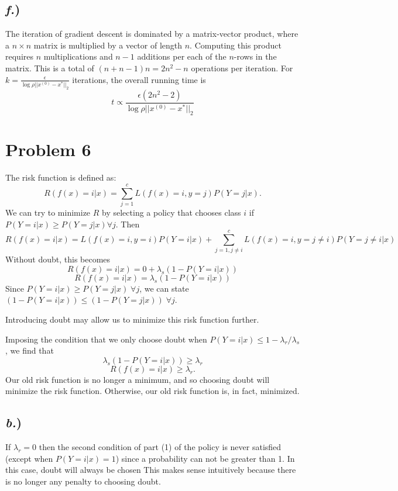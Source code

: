 \documentclass{report}
\begin{document}
\subsection*{\textit{f.})}

The iteration of gradient descent is dominated by a matrix-vector product, where a $n \times n$ matrix is multiplied by a vector of length $n$. Computing this product requires $n$ multiplications and $n-1$ additions per each of the $n$-rows in the matrix. This is a total of $(n + n -1)n = 2n^2-n$ operations per iteration. For $ k =  \frac{\epsilon}{\log\rho||x^{(0)} - x^*||_2}$ iterations, the overall running time is
$$ t \propto \frac{\epsilon(2n^2-2)}{\log\rho||x^{(0)} - x^*||_2} $$



\newpage
\section*{Problem 6}


The risk function is defined as:
$$R(f(x)=i|x) = \sum_{j=1}^c{L(f(x)=i,y=j)P(Y=j|x)}. $$
We can try to minimize $R$ by selecting a policy that chooses class $i$ if $P(Y=i|x) \geq P(Y=j|x) \forall j$.
Then 
$$R(f(x)=i|x) = L(f(x)=i,y=i)P(Y=i|x) + \sum_{j=1,j\neq i}^c{L(f(x)=i,y=j\neq i)P(Y=j\neq i|x)}$$
Without doubt, this becomes
$$ R(f(x)=i|x) = 0 + \lambda_s(1-P(Y=i|x)) $$
$$ R(f(x)=i|x) = \lambda_s(1-P(Y=i|x)) $$
Since $P(Y=i|x) \geq P(Y=j|x) \;\forall j$, we can state $(1-P(Y=i|x)) \leq (1-P(Y=j|x)) \;\forall j$.

Introducing doubt may allow us to minimize this risk function further. 



Imposing the condition that we only choose doubt when $P(Y=i|x) \leq 1-\lambda_r/\lambda_s$, we find that 
$$ \lambda_s(1-P(Y=i|x)) \geq \lambda_r $$
$$ R(f(x)=i|x) \geq \lambda_r. $$ 
Our old risk function is no longer a minimum, and so choosing doubt will minimize the risk function. Otherwise, our old risk function is, in fact, minimized.

\subsection*{\textit{b.})}
If $\lambda_r = 0$ then the second condition of part (1) of the policy is never satisfied (except when $P(Y=i|x)=1$) since a probability can not be greater than 1. In this case, doubt will always be chosen This makes sense intuitively because there is no longer any penalty to choosing doubt.
\end{document}
